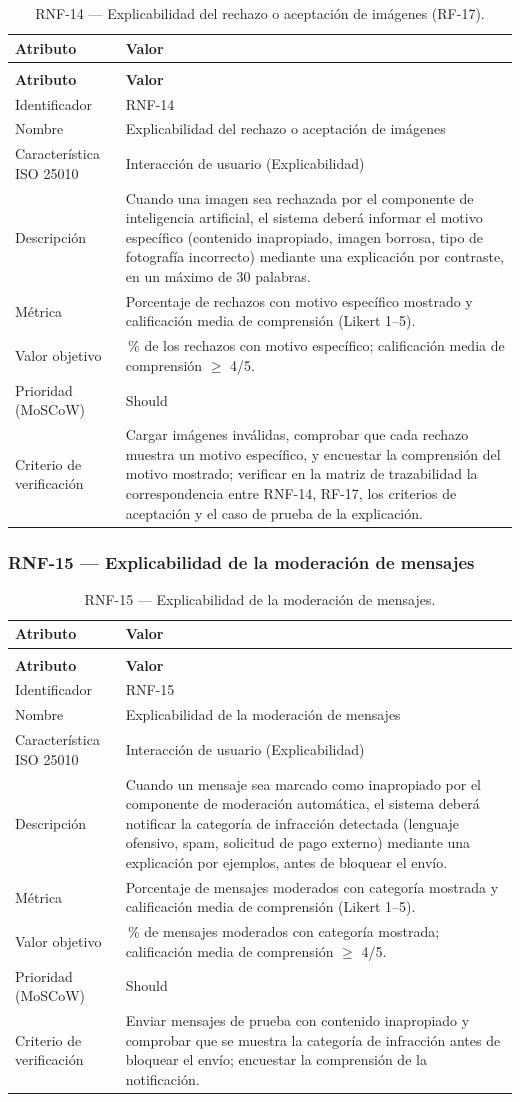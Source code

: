 \documentclass[journal,onecolumn]{IEEEtran}
\makeatletter
\newenvironment{atributos}[2]{%
	\small
	\begin{longtable}{@{}>{\raggedright\arraybackslash}p{4.2cm} >{\raggedright\arraybackslash}p{11.2cm}@{}}
		\caption{#2}\label{tab:#1}\\
		\toprule
		\textbf{Atributo} & \textbf{Valor} \\
		\midrule
		\endfirsthead
		\multicolumn{2}{@{}l}{\small\itshape (continuación)}\\
		\toprule
		\textbf{Atributo} & \textbf{Valor} \\
		\midrule
		\endhead
		\bottomrule
		\endlastfoot
	}{%
	\end{longtable}
	\normalsize
}
\makeatother
\begin{document}
	\begin{atributos}{RNF-14}{RNF-14 --- Explicabilidad del rechazo o aceptación de imágenes (RF-17).}
		Identificador & RNF-14 \\
		Nombre & Explicabilidad del rechazo o aceptación de imágenes \\
		Característica ISO 25010 & Interacción de usuario (Explicabilidad) \\
		Descripción & Cuando una imagen sea rechazada por el componente de inteligencia artificial, el sistema deberá informar el motivo específico (contenido inapropiado, imagen borrosa, tipo de fotografía incorrecto) mediante una explicación por contraste, en un máximo de 30 palabras. \\
		Métrica & Porcentaje de rechazos con motivo específico mostrado y calificación media de comprensión (Likert 1--5). \\
		Valor objetivo & 100\,\% de los rechazos con motivo específico; calificación media de comprensión $\geq$ 4/5. \\
		Prioridad (MoSCoW) & Should \\
		Criterio de verificación & Cargar imágenes inválidas, comprobar que cada rechazo muestra un motivo específico, y encuestar la comprensión del motivo mostrado; verificar en la matriz de trazabilidad la correspondencia entre RNF-14, RF-17, los criterios de aceptación y el caso de prueba de la explicación. \\
	\end{atributos}
	
	\subsubsection{RNF-15 --- Explicabilidad de la moderación de mensajes}
	
	\begin{atributos}{RNF-15}{RNF-15 --- Explicabilidad de la moderación de mensajes.}
		Identificador & RNF-15 \\
		Nombre & Explicabilidad de la moderación de mensajes \\
		Característica ISO 25010 & Interacción de usuario (Explicabilidad) \\
		Descripción & Cuando un mensaje sea marcado como inapropiado por el componente de moderación automática, el sistema deberá notificar la categoría de infracción detectada (lenguaje ofensivo, spam, solicitud de pago externo) mediante una explicación por ejemplos, antes de bloquear el envío. \\
		Métrica & Porcentaje de mensajes moderados con categoría mostrada y calificación media de comprensión (Likert 1--5). \\
		Valor objetivo & 100\,\% de mensajes moderados con categoría mostrada; calificación media de comprensión $\geq$ 4/5. \\
		Prioridad (MoSCoW) & Should \\
		Criterio de verificación & Enviar mensajes de prueba con contenido inapropiado y comprobar que se muestra la categoría de infracción antes de bloquear el envío; encuestar la comprensión de la notificación. \\
	\end{atributos}
	
\end{document}

